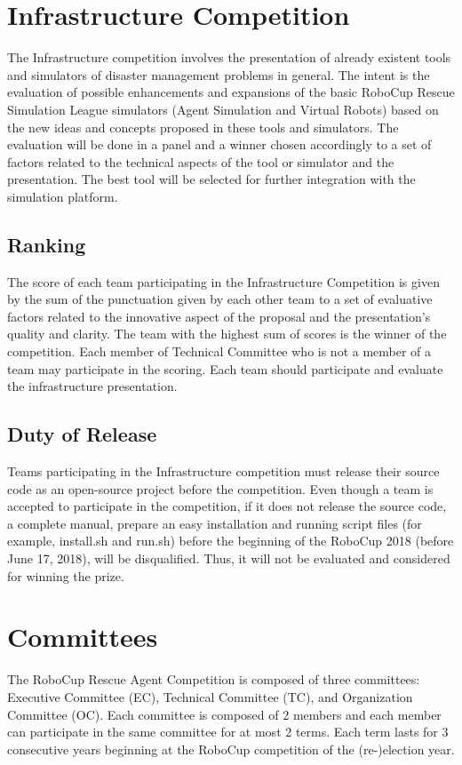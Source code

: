 \documentclass{article}
\begin{document}
\section{Infrastructure Competition}
\label{sec:infrastructure}
The Infrastructure competition involves the presentation of already existent 
tools and simulators of disaster management problems in general. The intent is 
the evaluation of possible enhancements and expansions of the basic RoboCup 
Rescue Simulation League simulators (Agent Simulation and Virtual Robots) based
on the new ideas and concepts proposed in these tools and simulators. The
evaluation will be done in a panel and a winner chosen accordingly to a set of
factors related to the technical aspects of the tool or simulator and the
presentation. The best tool will be selected for further integration with the
simulation platform.
\subsection{Ranking}
The score of each team participating in the Infrastructure Competition is given 
by the sum of the punctuation given by each other team to a set of evaluative 
factors related to the innovative aspect of the proposal and the presentation's 
quality and clarity. The team with the highest sum of scores is the winner of 
the competition. Each member of Technical Committee who is not a member of a 
team may participate in the scoring. Each team should participate and evaluate 
the infrastructure presentation.
\subsection{Duty of Release}
Teams participating in the Infrastructure competition must release their source 
code as an open-source project before the competition. Even though a team is 
accepted to participate in the competition, if it does not release the source 
code, a complete manual, prepare an easy installation and running script files 
(for example, install.sh and run.sh) before the beginning of the RoboCup 2018 
(before June 17, 2018), will be disqualified. Thus, it will not be evaluated 
and considered for winning the prize.
\section{Committees}
\label{sec:committees}
The RoboCup Rescue Agent Competition is composed of three committees:
Executive Committee (EC), Technical Committee (TC), and Organization Committee
(OC). Each committee is composed of 2 members and each member can participate in
the same committee for at most 2 terms. Each term lasts for 3 consecutive years
beginning at the RoboCup competition of the (re-)election year.
\end{document}
